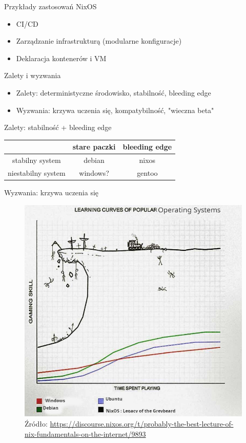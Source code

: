 \documentclass{beamer}
\begin{document}
\begin{frame}{Przykłady zastosowań NixOS}
    \begin{itemize}
        \item CI/CD
        \item Zarządzanie infrastrukturą (modularne konfiguracje)
        \item Deklaracja kontenerów i VM
    \end{itemize}
\end{frame}

\begin{frame}{Zalety i wyzwania}
    \begin{itemize}
        \item Zalety: deterministyczne środowisko, stabilność, bleeding edge
        \item Wyzwania: krzywa uczenia się, kompatybilność, "wieczna beta"
    \end{itemize}
\end{frame}

\begin{frame}{Zalety: stabilność + bleeding edge}

\begin{table}[]
\begin{tabular}{c|c|c|}
\cline{2-3}
                                         & stare paczki & bleeding edge \\ \hline
\multicolumn{1}{|c|}{stabilny system}    & debian       & nixos         \\ \hline
\multicolumn{1}{|c|}{niestabilny system} & windows?     & gentoo        \\ \hline
\end{tabular}
\end{table}
\end{frame}
\begin{frame}{Wyzwania: krzywa uczenia się}
    \begin{figure}
        \includegraphics[width=0.75\linewidth, height=0.75\textheight]{./assets/nixoscurve.jpg}
        \caption*{\scriptsize Źródło: \url{https://discourse.nixos.org/t/probably-the-best-lecture-of-nix-fundamentals-on-the-internet/9893}} %
    \end{figure}
\end{frame}
\end{document}
